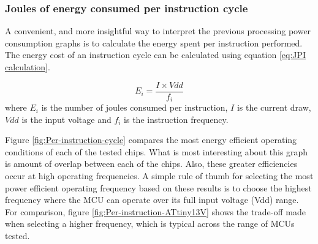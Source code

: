     \subsubsection*{Joules of energy consumed per instruction cycle\label{sub:Joules-of-energy}}

      A convenient, and more insightful way to interpret the previous processing power consumption graphs is to calculate the energy spent per instruction performed.
      The energy cost of an instruction cycle can be calculated using equation \ref{eq:JPI calculation}.

      \begin{equation}
      E_{i}=\frac{I\times Vdd}{f_{i}}\label{eq:JPI calculation}
      \end{equation}
      where $E_{i}$ is the number of joules consumed per instruction, $I$ is the current draw, $Vdd$ is the input voltage and $f_{i}$ is the instruction frequency.

      Figure \ref{fig:Per-instruction-cycle} compares the most energy efficient operating conditions of each of the tested chips.
      What is most interesting about this graph is amount of overlap between each of the chips.
      Also, these greater efficiencies occur at high operating frequencies.
      A simple rule of thumb for selecting the most power efficient operating frequency based on these results is to choose the highest frequency where the MCU can operate over its full input voltage (Vdd) range.
      For comparison, figure \ref{fig:Per-instruction-ATtiny13V} shows the trade-off made when selecting a higher frequency, which is typical across the range of MCUs tested.

